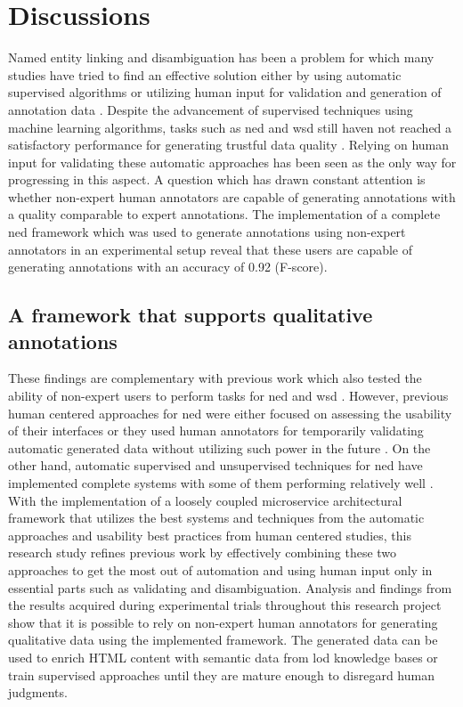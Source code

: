 \chapter{Discussions}
\label{chap:discussions}

Named entity linking and disambiguation has been a problem for which many studies have tried to find an effective solution either by using automatic supervised algorithms or utilizing human input for validation and generation of annotation data \cite{39, 9, dbpedia, 16, 31}. Despite the advancement of supervised techniques using machine learning algorithms, tasks such as \ac{ned} and \ac{wsd} still haven not reached a satisfactory performance for generating trustful data quality \cite{30}. Relying on human input for validating these automatic approaches has been seen as the only way for progressing in this aspect. A question which has drawn constant attention is whether non-expert human annotators are capable of generating annotations with a quality comparable to expert annotations. The implementation of a complete \ac{ned} framework which was used to generate annotations using non-expert annotators in an experimental setup reveal that these users are capable of generating annotations with an accuracy of 0.92 (F-score).


\section{A framework that supports qualitative annotations}
These findings are complementary with previous work which also tested the ability of non-expert users to perform tasks for \ac{ned} and \ac{wsd} \cite{14,16,9,32}. However, previous human centered approaches for \ac{ned} were either focused on assessing the usability of their interfaces \cite{15,16,17} or they used human annotators for temporarily validating automatic generated data without utilizing such power in the future \cite{31,32,33}. On the other hand, automatic supervised and unsupervised techniques for \ac{ned} have implemented complete systems with some of them performing relatively well \cite{39, 21}. With the implementation of a loosely coupled microservice architectural framework that utilizes the best systems and techniques from the automatic approaches and usability best practices from human centered studies, this research study refines previous work by effectively combining these two approaches to get the most out of automation and using human input only in essential parts such as validating and disambiguation. Analysis and findings from the results acquired during experimental trials throughout this research project show that it is possible to rely on non-expert human annotators for generating qualitative data using the implemented framework. The generated data can be used to enrich HTML content with semantic data from \ac{lod} knowledge bases or train supervised approaches until they are mature enough to disregard human judgments.  

